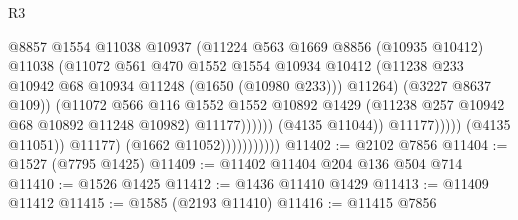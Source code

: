 \begin{lexlean}{R3}
\begin{coremodule}
                                                  @8857
                                                  @1554
                                                  @11038
                                                  @10937
                                                  (@11224
                                                    @563
                                                    @1669
                                                    @8856
                                                    (@10935 @10412)
                                                    @11038
                                                    (@11072
                                                      @561
                                                      @470
                                                      @1552
                                                      @1554
                                                      @10934
                                                      @10412
                                                      (@11238
                                                        @233
                                                        @10942
                                                        @68
                                                        @10934
                                                        @11248
                                                        (@1650 (@10980 @233)))
                                                      @11264)
                                                    (@3227 @8637 @109))
                                                  (@11072
                                                    @566
                                                    @116
                                                    @1552
                                                    @1552
                                                    @10892
                                                    @1429
                                                    (@11238 @257 @10942 @68 @10892 @11248 @10982)
                                                    @11177))))))
                                        (@4135 @11044))
                                      @11177)))))
                            (@4135 @11051))
                          @11177)
                        (@1662 @11052)))))))))))
@11402 := @2102 @7856
@11404 := @1527 (@7795 @1425)
@11409 := @11402 @11404 @204 @136 @504 @714
@11410 := @1526 @1425
@11412 := @1436 @11410 @1429
@11413 := @11409 @11412
@11415 := @1585 (@2193 @11410)
@11416 := @11415 @7856

\end{coremodule}
\end{lexlean}
